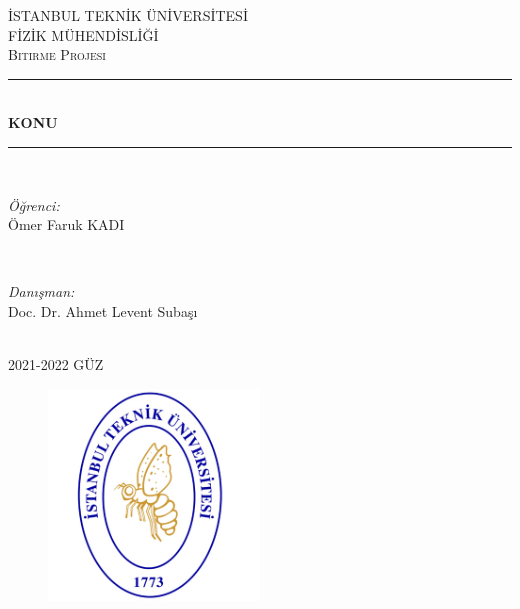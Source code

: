 \documentclass[12pt, a4paper]{article}
\newcommand{\HRule}{\rule{\linewidth}{0.8mm}}
\begin{document}
\begin{titlepage}


\centering

\textsc{\LARGE İSTANBUL TEKNİK ÜNİVERSİTESİ}\\[0.5cm]%
\textsc{\LARGE FİZİK MÜHENDİSLİĞİ}\\[1.5cm]
\textsc{\large Bitirme Projesi}\\[0.5cm]%

\HRule \\[0.4cm]
{ \huge \bfseries KONU} %
\HRule \\[1.5cm]

\begin{minipage}{0.4\textwidth}
\begin{flushleft} \large
\emph{Öğrenci:}\\
Ömer Faruk KADI %
\end{flushleft}
\end{minipage}
~
\begin{minipage}{0.4\textwidth}
\begin{flushright} \large
\emph{Danışman:} \\
Doc. Dr. Ahmet Levent Subaşı %
\end{flushright}
\end{minipage}\\[2cm]

{\large 2021-2022 GÜZ}\\[2cm] 

\begin{figure}[ht!]
    \centering
    \shorthandoff{=}
    \includegraphics[width=0.5\textwidth]{itu-logo1.jpg}
\end{figure}

\vfill %
\end{titlepage}
\end{document}
